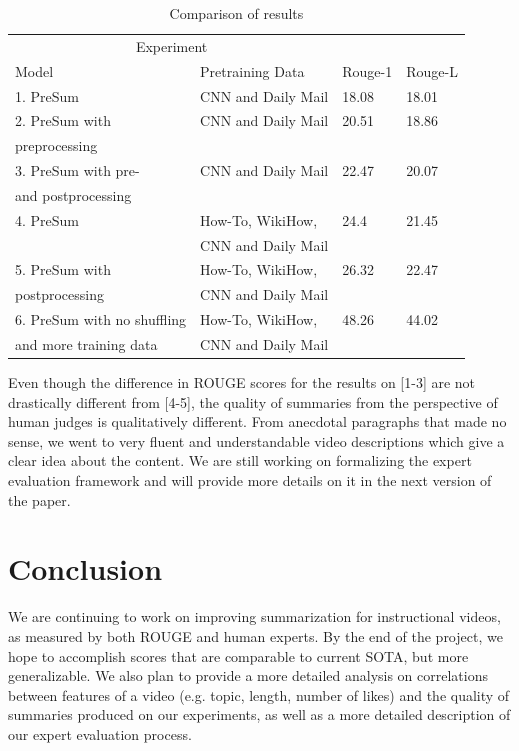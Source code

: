 \documentclass{article}
\begin{document}
\begin{table}[H]
  \caption{Comparison of results}
  \label{table1}
  \centering
  \begin{tabular}{llll}
    \toprule
    \multicolumn{2}{c}{Experiment}                   \\
    \cmidrule(r){1-2}
    Model     & Pretraining Data     & Rouge-1 &Rouge-L\\
    \midrule
   1. PreSum  & CNN  and Daily Mail &18.08 &18.01    \\
 \midrule   
    2. PreSum with     & CNN  and Daily Mail & 20.51 &18.86     \\
      preprocessing    & & \\
\midrule
    3. PreSum with pre-     & CNN  and Daily Mail  & 22.47&20.07  \\
      and postprocessing    & & \\
\midrule
  4. PreSum  & How-To, WikiHow,   & 24.4 &21.45     \\
& CNN  and Daily Mail&\\
\midrule
  5. PreSum with  & How-To, WikiHow, & 26.32 &22.47    \\
postprocessing &CNN  and Daily Mail &\\
\midrule
 6. PreSum with  no shuffling& How-To, WikiHow, & 48.26 &44.02    \\
and more training data &CNN  and Daily Mail &\\
     \bottomrule
  \end{tabular}
\end{table}



Even though the difference in ROUGE scores for the results on [1-3] are not drastically different from [4-5], the quality of summaries from the perspective of human judges is qualitatively different. From anecdotal paragraphs that made no sense, we went to very fluent and understandable video descriptions which give a clear idea about the content. We are still working on formalizing the expert evaluation framework and will provide more details on it in the next version of the paper. 

\section{Conclusion}
We are continuing to work on improving summarization for instructional videos, as measured by both ROUGE and human experts. By the end of the project, we hope to accomplish scores that are comparable to current SOTA, but more generalizable. We also plan to provide a more detailed analysis on correlations between features of a video (e.g. topic, length, number of likes) and the quality of summaries produced on our experiments, as well as a more detailed description of our expert evaluation process.
\end{document}
